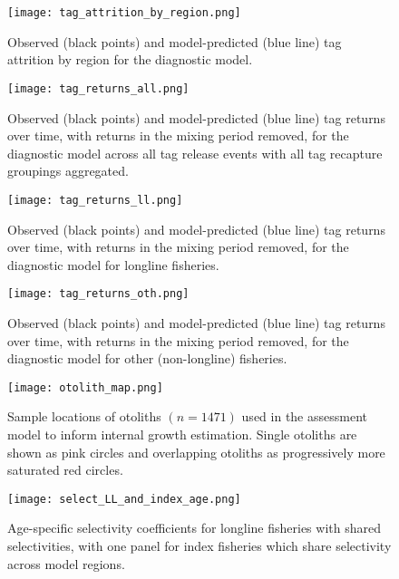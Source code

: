 \newpage
\begin{figure}[!ht]
  \centering
  \texttt{[image: tag\_attrition\_by\_region.png]}
  \caption{Observed (black points) and model-predicted (blue line) tag attrition by region for the diagnostic model. \label{fig:tag_attrition_by_region}}
\end{figure}
\clearpage

\newpage
\begin{figure}[!ht]
  \centering
  \texttt{[image: tag\_returns\_all.png]}
  \caption{Observed (black points) and model-predicted (blue line) tag returns over time, with returns in the mixing period removed, for the diagnostic model across all tag release events with all tag recapture groupings aggregated. \label{fig:tag_returns_all_year}}
\end{figure}
\clearpage

\newpage
\begin{figure}[!ht]
  \centering
  \texttt{[image: tag\_returns\_ll.png]}
  \caption{Observed (black points) and model-predicted (blue line) tag returns over time, with returns in the mixing period removed, for the diagnostic model for longline fisheries. \label{fig:tag_returns_by_fishery_ll}}
\end{figure}
\clearpage

\newpage
\begin{figure}[!ht]
  \centering
  \texttt{[image: tag\_returns\_oth.png]}
  \caption{Observed (black points) and model-predicted (blue line) tag returns over time, with returns in the mixing period removed, for the diagnostic model for other (non-longline) fisheries. \label{fig:tag_returns_by_fishery_oth}}
\end{figure}
\clearpage

\newpage
\begin{figure}[!ht]
  \centering
  \texttt{[image: otolith\_map.png]}
  \caption{Sample locations of otoliths $(n=1471)$ used in the assessment model to inform internal growth estimation. Single otoliths are shown as pink circles and overlapping otoliths as progressively more saturated red circles. \label{fig:otolith_map}}
\end{figure}
\clearpage

\newpage
\begin{figure}[!ht]
  \centering
  \texttt{[image: select\_LL\_and\_index\_age.png]}
  \caption{Age-specific selectivity coefficients for longline fisheries with shared selectivities, with one panel for index fisheries which share selectivity across model regions. \label{fig:select_LL_and_index_age}}
\end{figure}
\clearpage

